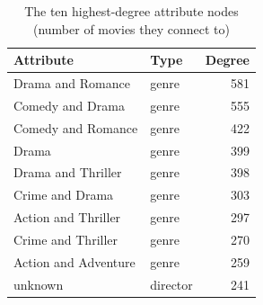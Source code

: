 \begin{table}[H]
\centering
\small
\begin{tabular}{llr}
\toprule
Attribute & Type & Degree \\
\midrule
Drama and Romance & genre & 581 \\
Comedy and Drama & genre & 555 \\
Comedy and Romance & genre & 422 \\
Drama & genre & 399 \\
Drama and Thriller & genre & 398 \\
Crime and Drama & genre & 303 \\
Action and Thriller & genre & 297 \\
Crime and Thriller & genre & 270 \\
Action and Adventure & genre & 259 \\
unknown & director & 241 \\
\bottomrule
\end{tabular}
\caption{The ten highest-degree attribute nodes (number of movies they connect to)}
\label{tab:kg_top}
\end{table}

